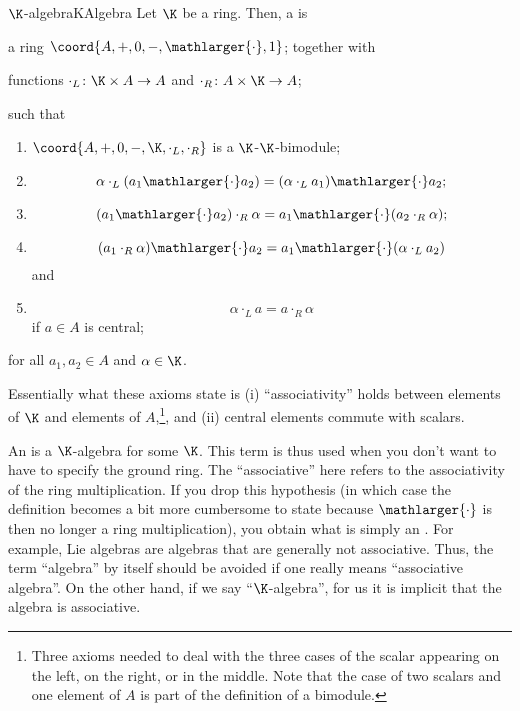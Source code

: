 \begin{dfn}{$\K$-algebra}{KAlgebra}
	Let $\K$ be a ring.  Then, a  is
	\begin{data}
		\item a ring $\coord{A,+,0,-,\mathlarger{\cdot},1}$; together with
		\item functions $\cdot _L\colon \K \times A\rightarrow A$ and $\cdot _R\colon A\times \K \rightarrow A$;
	\end{data}
	such that
	\begin{enumerate}
		\item \label{KAlgebra(i)}$\coord{A,+,0,-,\K ,\cdot _L,\cdot _R}$ is a $\K$-$\K$-bimodule;
		\item \label{KAlgebra(ii)}
		\begin{equation}
			\alpha \cdot _L(a_1\mathlarger{\cdot}a_2)=(\alpha \cdot _La_1)\mathlarger{\cdot}a_2;
		\end{equation}
		\item \label{KAlgebra(iii)}
		\begin{equation}
			(a_1\mathlarger{\cdot}a_2)\cdot _R\alpha =a_1\mathlarger{\cdot}(a_2\cdot _R\alpha );
		\end{equation}
		\item \label{KAlgebra(iiix)}
		\begin{equation}
			(a_1\cdot _R\alpha )\mathlarger{\cdot}a_2=a_1\mathlarger{\cdot}(\alpha \cdot _La_2)
		\end{equation}
		and
		\item \label{KAlgebra(iv)}
		\begin{equation}
			\alpha \cdot _La=a\cdot _R\alpha
		\end{equation}
		if $a\in A$ is central;
	\end{enumerate}
	for all $a_1,a_2\in A$ and $\alpha \in \K$.
	\begin{rmk}
		Essentially what these axioms state is (i) ``associativity'' holds between elements of $\K$ and elements of $A$,\footnote{Three axioms needed to deal with the three cases of the scalar appearing on the left, on the right, or in the middle.  Note that the case of two scalars and one element of $A$ is part of the definition of a bimodule.}, and (ii) central elements commute with scalars.
	\end{rmk}
	\begin{rmk}
		An  is a $\K$-algebra for some $\K$.  This term is thus used when you don't want to have to specify the ground ring.  The ``associative'' here refers to the associativity of the ring multiplication.  If you drop this hypothesis (in which case the definition becomes a bit more cumbersome to state because $\mathlarger{\cdot}$ is then no longer a ring multiplication), you obtain what is simply an .  For example, Lie algebras are algebras that are generally not associative.  Thus, the term ``algebra'' by itself should be avoided if one really means ``associative algebra''.  On the other hand, if we say ``$\K$-algebra'', for us it is implicit that the algebra is associative.

\end{rmk}
\end{dfn}
